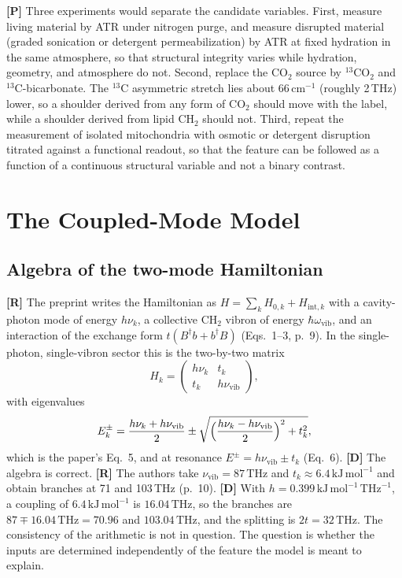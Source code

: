 \documentclass[11pt]{article}
\newcommand{\stR}{\textbf{\textcolor{blue!55!black}{[R]}}}
\newcommand{\stD}{\textbf{\textcolor{green!40!black}{[D]}}}
\newcommand{\stP}{\textbf{\textcolor{violet!80!black}{[P]}}}
\newcommand{\thz}{\,\mathrm{THz}}
\newcommand{\kjm}{\,\mathrm{kJ\,mol^{-1}}}
\newcommand{\cmi}{\,\mathrm{cm^{-1}}}
\theoremstyle{plain}
\theoremstyle{definition}
\theoremstyle{remark}
\begin{document}
\stP{} Three experiments would separate the candidate variables. First, measure living material by ATR under nitrogen purge, and measure disrupted material (graded sonication or detergent permeabilization) by ATR at fixed hydration in the same atmosphere, so that structural integrity varies while hydration, geometry, and atmosphere do not. Second, replace the CO$_2$ source by $^{13}$CO$_2$ and $^{13}$C-bicarbonate. The $^{13}$C asymmetric stretch lies about $66\cmi$ (roughly 2\,THz) lower, so a shoulder derived from any form of CO$_2$ should move with the label, while a shoulder derived from lipid CH$_2$ should not. Third, repeat the measurement of isolated mitochondria with osmotic or detergent disruption titrated against a functional readout, so that the feature can be followed as a function of a continuous structural variable and not a binary contrast.

\section{The Coupled-Mode Model}
\label{sec:model}

\subsection{Algebra of the two-mode Hamiltonian}

\stR{} The preprint writes the Hamiltonian as $H=\sum_k H_{0,k}+H_{\mathrm{int},k}$ with a cavity-photon mode of energy $h\nu_k$, a collective CH$_2$ vibron of energy $\hbar\omega_{\mathrm{vib}}$, and an interaction of the exchange form $t(B^\dagger b+b^\dagger B)$ (Eqs.~1--3, p.~9). In the single-photon, single-vibron sector this is the two-by-two matrix
\begin{equation}
H_k=\begin{pmatrix} h\nu_k & t_k\\ t_k & h\nu_{\mathrm{vib}}\end{pmatrix},
\end{equation}
with eigenvalues
\begin{equation}
E_k^{\pm}=\frac{h\nu_k+h\nu_{\mathrm{vib}}}{2}\pm\sqrt{\Bigl(\frac{h\nu_k-h\nu_{\mathrm{vib}}}{2}\Bigr)^{2}+t_k^{2}},
\label{eq:branches}
\end{equation}
which is the paper's Eq.~5, and at resonance $E^{\pm}=h\nu_{\mathrm{vib}}\pm t_k$ (Eq.~6). \stD{} The algebra is correct. \stR{} The authors take $\nu_{\mathrm{vib}}=87\thz$ and $t_k\approx6.4\kjm$ and obtain branches at 71 and 103\,THz (p.~10). \stD{} With $h=0.399\kjm\thz^{-1}$, a coupling of $6.4\kjm$ is $16.04\thz$, so the branches are $87\mp16.04\thz=70.96$ and $103.04\thz$, and the splitting is $2t=32\thz$. The consistency of the arithmetic is not in question. The question is whether the inputs are determined independently of the feature the model is meant to explain.
\end{document}
